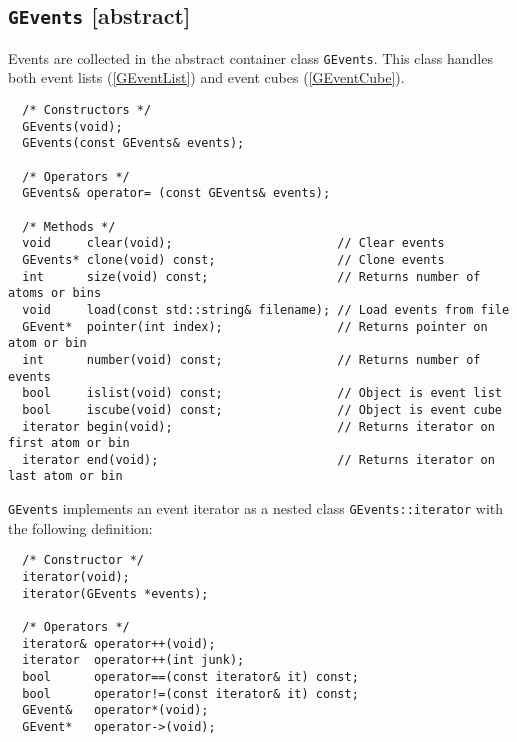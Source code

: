 \documentclass{article}[12pt,a4]
\begin{document}
\subsection{{\tt GEvents} \small[abstract]}
Events are collected in the abstract container class {\tt GEvents}.
This class handles both event lists (\ref{GEventList}) and event cubes (\ref{GEventCube}).
\begin{verbatim}
  /* Constructors */
  GEvents(void);
  GEvents(const GEvents& events);

  /* Operators */
  GEvents& operator= (const GEvents& events);

  /* Methods */
  void     clear(void);                       // Clear events
  GEvents* clone(void) const;                 // Clone events
  int      size(void) const;                  // Returns number of atoms or bins
  void     load(const std::string& filename); // Load events from file
  GEvent*  pointer(int index);                // Returns pointer on atom or bin
  int      number(void) const;                // Returns number of events
  bool     islist(void) const;                // Object is event list
  bool     iscube(void) const;                // Object is event cube
  iterator begin(void);                       // Returns iterator on first atom or bin
  iterator end(void);                         // Returns iterator on last atom or bin
\end{verbatim}
{\tt GEvents} implements an event iterator as a nested class 
{\tt GEvents::iterator} with the following definition:
\begin{verbatim}
  /* Constructor */
  iterator(void);
  iterator(GEvents *events);

  /* Operators */
  iterator& operator++(void);
  iterator  operator++(int junk);
  bool      operator==(const iterator& it) const;
  bool      operator!=(const iterator& it) const;
  GEvent&   operator*(void);
  GEvent*   operator->(void);
\end{verbatim}


\end{document}
